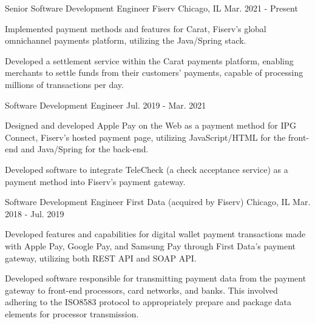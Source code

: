 
\begin{cventries}

    \cventry
    {Senior Software Development Engineer} %
    {Fiserv} %
    {Chicago, IL} %
    {Mar. 2021 - Present} %
    {
        \begin{cvitems} %
            \item {Implemented payment methods and features for Carat, Fiserv’s global omnichannel payments platform, utilizing the Java/Spring stack.}
            \item {Developed a settlement service within the Carat payments platform, enabling merchants to settle funds from their customers' payments, capable of processing millions of transactions per day.}
        \end{cvitems}
    }
    \cventry
    {Software Development Engineer} %
    {} %
    {} %
    {Jul. 2019 - Mar. 2021} %
    {
        \begin{cvitems} %
            \item {Designed and developed Apple Pay on the Web as a payment method for IPG Connect, Fiserv's hosted payment page, utilizing JavaScript/HTML for the front-end and Java/Spring for the back-end.}
            \item {Developed software to integrate TeleCheck (a check acceptance service) as a payment method into Fiserv's payment gateway.}
        \end{cvitems}
    }


    \cventry
    {Software Development Engineer} %
    {First Data (acquired by Fiserv)} %
    {Chicago, IL} %
    {Mar. 2018 - Jul. 2019} %
    {
        \begin{cvitems} %
            \item {Developed features and capabilities for digital wallet payment transactions made with Apple Pay, Google Pay, and Samsung Pay through First Data's payment gateway, utilizing both REST API and SOAP API.}
            \item {Developed software responsible for transmitting payment data from the payment gateway to front-end processors, card networks, and banks. This involved adhering to the ISO8583 protocol to appropriately prepare and package data elements for processor transmission.}
        \end{cvitems}
    }


\end{cventries}
